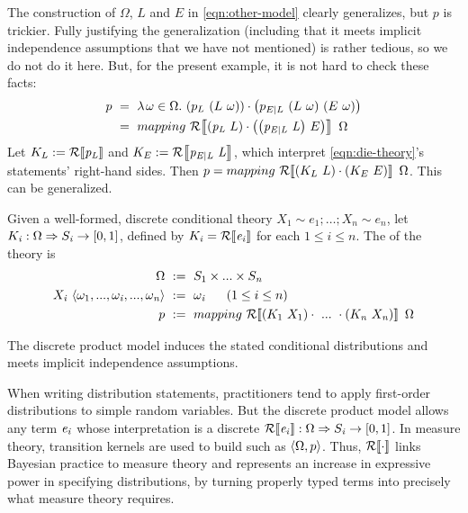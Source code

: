 The construction of $\Omega$, $L$ and $E$ in \eqref{eqn:other-model} clearly generalizes, but $p$ is trickier. Fully justifying the generalization (including that it meets implicit independence assumptions that we have not mentioned) is rather tedious, so we do not do it here. But, for the present example, it is not hard to check these facts:
\begin{equation}
\begin{split}
	p &\ =\ \lambda\mspace{2mu}{\omega \in \Omega}\ldotp\, {\left({p_L}\ {\left({L}\ {\omega}\right)}\right)} \cdot {\left({p_{E|L}}\ {\left({L}\ {\omega}\right)}\ {\left({E}\ {\omega}\right)}\right)}
\\
		&\ =\ mapping~\mathcal{R}\!\left\llbracket{\left({\mathit{p_L}}\ {L}\right) \cdot \left({\mathit{\left({p_{E|L}}\ {L}\right)}}\ {E}\right)}\right\rrbracket~\Omega
\end{split}
\end{equation}
Let $K_L := \mathcal{R}\!\left\llbracket{\mathit{p_L}}\right\rrbracket$ and $K_E := \mathcal{R}\!\left\llbracket{\mathit{{p_{E|L}}\ {L}}}\right\rrbracket$, which interpret \eqref{eqn:die-theory}'s statements' right-hand sides.
Then $p = mapping~\mathcal{R}\!\left\llbracket{\left({K_L}\ {L}\right) \cdot \left({K_E}\ {E}\right)}\right\rrbracket~\Omega$. This can be generalized.

\begin{definition}
\label{def:discrete-product-model}
Given a well-formed, discrete conditional theory $\mathit{X_1 \sim e_1; \dots; X_n \sim e_n}$, let $K_\mathit{i} : \Omega \Rightarrow S_\mathit{i} \to [0,1]$, defined by $K_\mathit{i} = \mathcal{R}\!\left\llbracket{\mathit{e_i}}\right\rrbracket$ for each $1 \le \mathit{i} \le \mathit{n}$. The  of the theory is
\begin{equation}
\begin{split}
	\Omega&\ :=\ S_1 \times ... \times S_\mathit{n}
\\
	X_\mathit{i}~\langle{\omega_1,...,\omega_\mathit{i},...,\omega_\mathit{n}}\rangle &\ :=\ \omega_\mathit{i}\ \ \ \ \ (1 \le i \le n)
\\
	p&\ :=\ mapping~\mathcal{R}\!\left\llbracket{(K_1~X_1) \cdot~...~\cdot (K_\mathit{n}~X_\mathit{n})}\right\rrbracket~\Omega
\end{split}
\label{eqn:product-model}
\end{equation}
\end{definition}

\begin{theorem}
The discrete product model induces the stated conditional distributions and meets implicit independence assumptions.
\end{theorem}

When writing distribution statements, practitioners tend to apply first-order distributions to simple random variables. But the discrete product model allows any \targetlang term $\mathit{e_i}$ whose interpretation is a discrete  $\mathcal{R}\!\left\llbracket{\mathit{e_i}}\right\rrbracket : \Omega \Rightarrow S_\mathit{i} \to [0,1]$. In measure theory, transition kernels are used to build  such as $\langle{\Omega,p}\rangle$. Thus, $\mathcal{R}\!\left\llbracket{\cdot}\right\rrbracket$ links Bayesian practice to measure theory and represents an increase in expressive power in specifying distributions, by turning properly typed \targetlang terms into precisely what measure theory requires.

